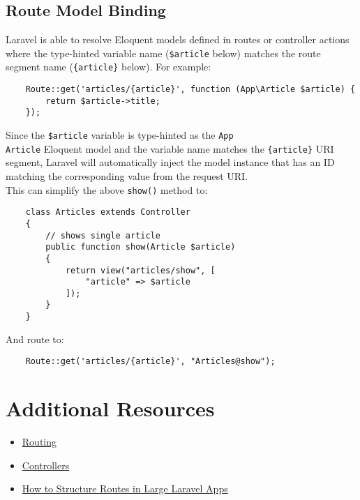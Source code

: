 \subsection{Route Model Binding}

Laravel is able to resolve Eloquent models defined in routes or controller actions where the type-hinted variable name (\texttt{\$article} below) matches the route segment name (\texttt{\{article\}} below). For example:

\begin{verbatim}
    Route::get('articles/{article}', function (App\Article $article) {
        return $article->title;
    });
\end{verbatim}

Since the \texttt{\$article} variable is type-hinted as the \texttt{App\\Article} Eloquent model and the variable name matches the \texttt{\{article\}} URI segment, Laravel will automatically inject the model instance that has an ID matching the corresponding value from the request URI.
\\

This can simplify the above \texttt{show()} method to:

\begin{verbatim}
    class Articles extends Controller
    {
        // shows single article
        public function show(Article $article)
        {
            return view("articles/show", [
                "article" => $article
            ]);
        }
    }
\end{verbatim}

And route to:

\begin{verbatim}
    Route::get('articles/{article}', "Articles@show");
\end{verbatim}

\section{Additional Resources}

\begin{itemize}[leftmargin=*]
    \item \href{https://laravel.com/docs/master/routing}{Routing}
    \item \href{http://laravel.com/docs/master/controllers}{Controllers}
    \item \href{https://laraveldaily.com/how-to-structure-routes-in-large-laravel-projects/}{How to Structure Routes in Large Laravel Apps}
\end{itemize}
